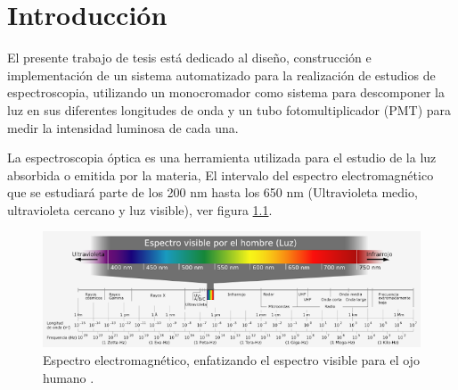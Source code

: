 \chapter{Introducción}
El presente trabajo de tesis está dedicado al diseño, construcción e implementación de un sistema automatizado para la realización de estudios de espectroscopia, utilizando un monocromador como sistema para descomponer la luz  en sus diferentes longitudes de onda y un tubo fotomultiplicador (PMT) para medir la intensidad luminosa de cada una.

La espectroscopia óptica es una herramienta utilizada para el estudio de la luz absorbida o emitida por la materia, El intervalo del espectro electromagnético que se estudiará parte de los 200 nm hasta los 650 nm (Ultravioleta medio, ultravioleta cercano y luz visible), ver figura \ref{fig:espectrovisible}.
\begin{figure}[h!]%
	\centering
	\includegraphics[width=1\linewidth]{Imagenes/espectro_visible}
	\caption{Espectro electromagnético, enfatizando el espectro visible para el ojo humano \cite{espectroOjo}.}
	\label{fig:espectrovisible}
\end{figure}

